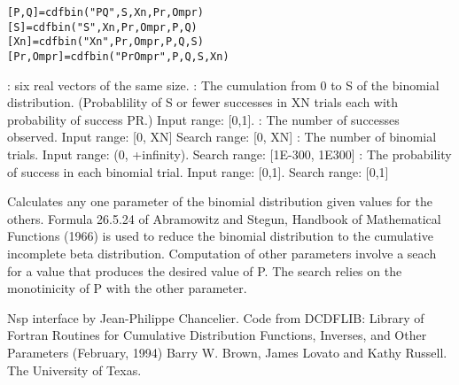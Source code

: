 \begin{mandesc}
\end{mandesc}
\label{cdfbin}
\begin{calling_sequence}
\begin{verbatim}
[P,Q]=cdfbin("PQ",S,Xn,Pr,Ompr)  
[S]=cdfbin("S",Xn,Pr,Ompr,P,Q)  
[Xn]=cdfbin("Xn",Pr,Ompr,P,Q,S)  
[Pr,Ompr]=cdfbin("PrOmpr",P,Q,S,Xn)  
\end{verbatim}
\end{calling_sequence}
\begin{parameters}
  \begin{varlist}
     : six real vectors of the same size.
     : The cumulation from 0 to S of the binomial distribution. (Probablility of S or fewer successes in XN trials each with probability of success PR.) Input range: [0,1].
     : The number of successes observed. Input range: [0, XN] Search range: [0, XN]
     : The number of binomial trials. Input range: (0, +infinity). Search range: [1E-300, 1E300]
     : The probability of success in each binomial trial. Input range: [0,1]. Search range: [0,1]
  \end{varlist}
\end{parameters}

\begin{mandescription}
  Calculates any one parameter of the binomial distribution given values for the others.
  Formula  26.5.24    of   Abramowitz  and    Stegun,  Handbook   of
  Mathematical   Functions (1966) is   used  to reduce the  binomial
  distribution  to  the  cumulative incomplete    beta distribution.
  Computation of other parameters involve a seach for a value that
  produces  the desired  value  of P.   The search relies  on  the
  monotinicity of P with the other parameter.
\end{mandescription}
\begin{authors}
  Nsp interface by Jean-Philippe Chancelier. Code from DCDFLIB: 
  Library of Fortran Routines for Cumulative Distribution
  Functions, Inverses, and Other Parameters (February, 1994)
  Barry W. Brown, James Lovato and Kathy Russell. The University of Texas.
\end{authors}

